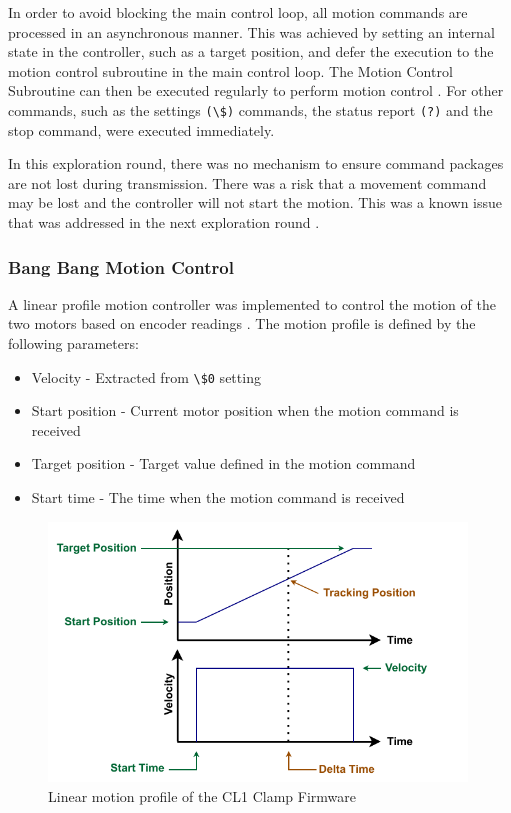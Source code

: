 In order to avoid blocking the main control loop, all motion commands are processed in an asynchronous manner. This was achieved by setting an internal state in the controller, such as a target position, and defer the execution to the motion control subroutine in the main control loop. The Motion Control Subroutine can then be executed regularly to perform motion control . For other commands, such as the settings \verb|(\$)| commands, the status report \verb|(?)| and the stop command, were executed immediately. 

In this exploration round, there was no mechanism to ensure command packages are not lost during transmission. There was a risk that a movement command may be lost and the controller will not start the motion. This was a known issue that was addressed in the next exploration round .

\FloatBarrier

\subsubsection{Bang Bang Motion Control}
\label{subsubsection:exploration-1-bang-bang-motion-control}



A linear profile motion controller was implemented to control the motion of the two motors based on encoder readings \parencite{tanPrecisionMotionControl2001}. The motion profile is defined by the following parameters:

\begin{itemize} [nosep]
    \item Velocity - Extracted from \verb|\$0| setting
    \item Start position - Current motor position when the motion command is received
    \item Target position - Target value defined in the motion command
    \item Start time - The time when the motion command is received
\end{itemize}

\begin{figure}[h]
    \centering
    \includegraphics[width=0.99\textwidth]{images/04-3/firmware-motion-control.pdf}
    \caption{Linear motion profile of the CL1 Clamp Firmware}
    \label{fig:linear-motion-profile}
\end{figure}

